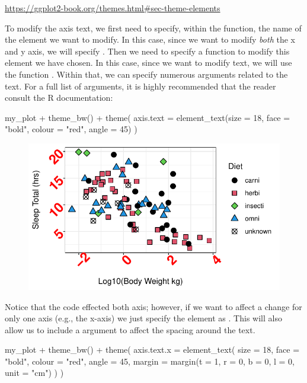 \begin{center}
\url{https://ggplot2-book.org/themes.html#sec-theme-elements}
\end{center}

To modify the axis text, we first need to specify, within the  function, the name of the element we want to modify. In this case, since we want to modify \textit{both} the x and y axis, we will specify .  Then we need to specify a function to modify this element we have chosen. In this case, since we want to modify text, we will use the function . Within that, we can specify numerous arguments related to the text. For a full list of arguments, it is highly recommended that the reader consult the R documentation: 

\begin{inR}
my_plot + theme_bw() +
  theme(
    axis.text = element_text(size = 18, face = "bold", colour = "red", angle = 45)
  )
\end{inR}

\vspace{2em}

\begin{figure}[H]
\includegraphics[scale = .75]{graphics/ch2Figs/ggEx_33.pdf}
\end{figure}

Notice that the code effected both axis; however, if we want to affect a change for only one axis (e.g., the x-axis) we just specify the element as .  This will also allow us to include a  argument to affect the spacing around the text.

\begin{inR}
my_plot + theme_bw() +
  theme(
    axis.text.x = element_text(
      size = 18, face = "bold", colour = "red", angle = 45,
      margin = margin(t = 1, r = 0, b = 0, l = 0, unit = "cm")
    )
  )
\end{inR}

